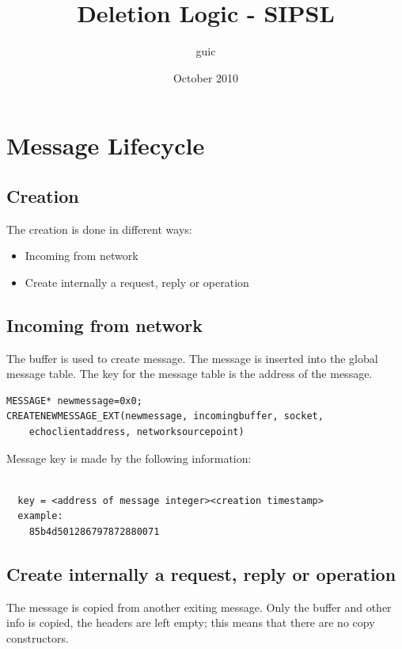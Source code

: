 \documentclass[a4paper]{article}
\title{Deletion Logic - SIPSL}
\author{guic}
\date{October 2010}
\begin{document}
	\small
	\maketitle
\section{Message Lifecycle}

\subsection{Creation}

The creation is done in different ways:

\begin{itemize}
   \item Incoming from network
   \item Create internally a request, reply or operation
\end{itemize}

\subsection{Incoming from network}

The buffer is used to create message. The message is inserted into the global message table. 
The key for the message table is the address of the message.

\begin{verbatim}
MESSAGE* newmessage=0x0;
CREATENEWMESSAGE_EXT(newmessage, incomingbuffer, socket,
    echoclientaddress, networksourcepoint)
\end{verbatim}

Message key is made by the following information:
\begin{verbatim}

  key = <address of message integer><creation timestamp>
  example:
    85b4d501286797872880071

\end{verbatim}
	
\subsection{Create internally a request, reply or operation}
	
The message is copied from another exiting message. Only the buffer and other info is copied, the headers are left empty; this means that there are no copy constructors.	
	
\end{document}
